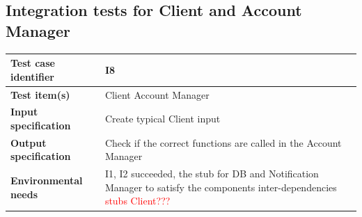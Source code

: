 \documentclass[a4paper,11pt]{report} %
\begin{document}
		\subsection{Integration tests for Client and Account Manager}
			\begin{minipage}{\linewidth}
			\end{minipage}		
		\begin{center}
			\renewcommand{\arraystretch}{1.2}
			\setlength{\tabcolsep}{24pt}
			\begin{tabular}{ l  p{9cm}}\hline
				\textbf{Test case identifier} & I8\\\hline
				\textbf{Test item(s)} & Client \textrightarrow Account Manager\\\hline
				\textbf{Input specification} & Create typical Client input \\\hline
				\textbf{Output specification} & Check if the correct functions are called in the Account Manager\\\hline
				\textbf{Environmental needs} &  I1, I2 succeeded, the stub for DB and Notification Manager to satisfy the components inter-dependencies \textcolor{red}{stubs Client???}\\\hline
			\end{tabular}
		\end{center}	
\end{document}

